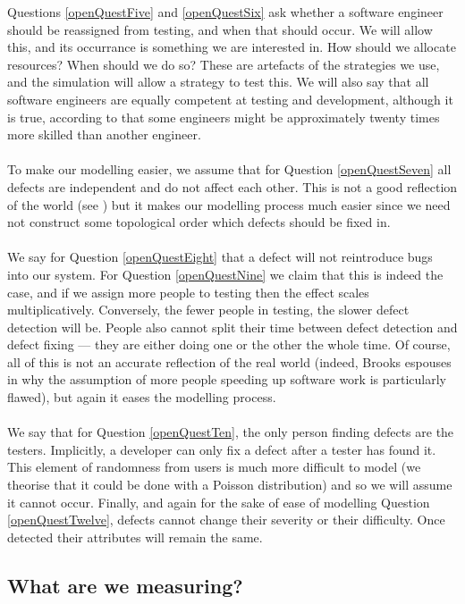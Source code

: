 Questions \ref{openQuestFive} and \ref{openQuestSix} ask whether a software engineer should be reassigned from testing, and
when that should occur.
We will allow this, and its occurrance is something we are interested in.
How should we allocate resources?
When should we do so?
These are artefacts of the strategies we use, and the simulation will allow a strategy to test
this.
We will also say that all software engineers are equally competent at testing and development,
although it is true, according to \FIXME that some engineers might be approximately twenty times
more skilled than another engineer.\\
\\
To make our modelling easier, we assume that for Question \ref{openQuestSeven} all defects are
independent and do not affect each other.
This is not a good reflection of the world (see \FIXME) but it makes our modelling process much
easier since we need not construct some topological order which defects should be fixed in.\\
\\
We say for Question \ref{openQuestEight} that a defect will not reintroduce bugs into our system.
For Question \ref{openQuestNine} we claim that this is indeed the case, and if we assign more people
to testing then the effect scales multiplicatively.
Conversely, the fewer people in testing, the slower defect detection will be.
People also cannot split their time between defect detection and defect fixing --- they are either
doing one or the other the whole time.
Of course, all of this is not an accurate reflection of the real world (indeed, Brooks espouses in
\FIXME why the assumption of more people speeding up software work is particularly flawed), but again
it eases the modelling process.\\
\\
We say that for Question \ref{openQuestTen}, the only person finding defects are the
testers.
Implicitly, a developer can only fix a defect after a tester has found it.
This element of randomness from users is much more difficult to model (we theorise that it could be
done with a Poisson distribution) and so we will assume it cannot occur.
Finally, and again for the sake of ease of modelling Question \ref{openQuestTwelve}, defects cannot
change their severity or their difficulty.
Once detected their attributes will remain the same.

\subsection{What are we measuring?}

